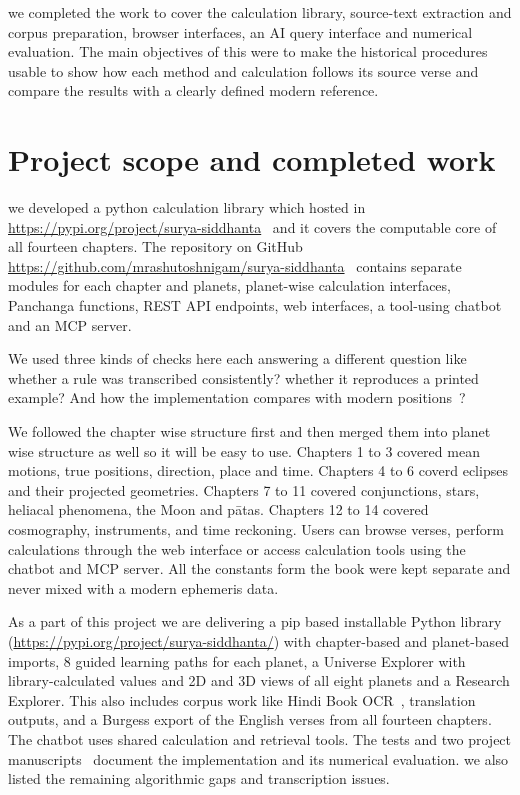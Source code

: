 \documentclass[12pt,a4paper,oneside]{report}
\begin{document}
we completed the work to cover the calculation library, source-text extraction and corpus preparation, browser interfaces, an AI query interface and numerical evaluation. The main objectives of this were to make the historical procedures usable to show how each method and calculation follows its source verse and compare the results with a clearly defined modern reference.

\section{Project scope and completed work}

we developed a python calculation library which hosted in \url{https://pypi.org/project/surya-siddhanta}~\cite{suryasiddhanta} and it covers the computable core of all fourteen chapters. The repository on GitHub \url{https://github.com/mrashutoshnigam/surya-siddhanta}~\cite{nigam_repo} contains separate modules for each chapter and planets, planet-wise calculation interfaces, Panchanga functions, REST API endpoints, web interfaces, a tool-using chatbot and an MCP server.

We used three kinds of checks here each answering a different question like whether a rule was transcribed consistently? whether it reproduces a printed example? And how the implementation compares with modern positions~\cite{Park2021DE440}?

We followed the chapter wise structure first and then merged them into planet wise structure as well so it will be easy to use. Chapters 1 to 3 covered mean motions, true positions, direction, place and time. Chapters 4 to 6 coverd eclipses and their projected geometries. Chapters 7 to 11 covered conjunctions, stars, heliacal phenomena, the Moon and pātas. Chapters 12 to 14 covered cosmography, instruments, and time reckoning. Users can browse verses, perform calculations through the web interface or access calculation tools using the chatbot and MCP server. All the constants form the book were kept separate and never mixed with a modern ephemeris data.

As a part of this project we are delivering a pip based installable Python library (\url{https://pypi.org/project/surya-siddhanta/}) with chapter-based and planet-based imports, 8 guided learning paths for each planet, a Universe Explorer with library-calculated values and 2D and 3D views of all eight planets and a Research Explorer. This also includes corpus work like Hindi Book OCR~\cite{nigam_sscorpus}, translation outputs, and a Burgess export of the English verses from all fourteen chapters. The chatbot uses shared calculation and retrieval tools. The tests and two project manuscripts~\cite{nigam2026edition,nigam2026de440} document the implementation and its numerical evaluation. we also listed the remaining algorithmic gaps and transcription issues.
\end{document}
